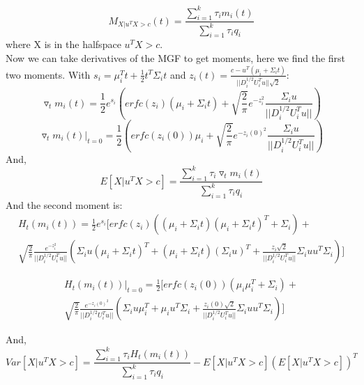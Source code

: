 \documentclass{article}
\begin{document}
\begin{equation}
\label{eq:mgf}
M_{X|u^TX>c}(t) = \frac{\sum\limits_{i=1}^k \tau_i m_i(t)}{\sum\limits_{i=1}^k \tau_i q_i}
\end{equation}
where X is in the halfspace $u^TX > c$. \\
\null \quad Now we can take derivatives of the MGF to get moments, here we find the first two moments. With $s_i=\mu_i^Tt+\frac{1}{2}t^T\Sigma_i t$ and $z_i(t) = \frac{c - u^T(\mu_i + \Sigma_i t)}{||D_i^{1/2}U_i^Tu||\sqrt{2}}$:
\begin{equation}
\triangledown_tm_i(t) = \frac{1}{2}e^{s_i}(erfc(z_i)(\mu_i+\Sigma_i t) + \sqrt{\frac{2}{\pi}}e^{-z_i^2}\frac{\Sigma_i u}{||D_i^{1/2}U_i^Tu||})
\end{equation}
\begin{equation}
\triangledown_tm_i(t) |_{t=0}= \frac{1}{2}(erfc(z_i(0))\mu_i + \sqrt{\frac{2}{\pi}}e^{-z_i(0)^2}\frac{\Sigma_i u}{||D_i^{1/2}U_i^Tu||})
\end{equation}
And,
\begin{equation}
E[X|u^TX>c] =  \frac{\sum\limits_{i=1}^k \tau_i \triangledown_t m_i(t)}{\sum\limits_{i=1}^k \tau_i q_i}
\end{equation}
And the second moment is:
\begin{equation}
\begin{split}
H_t(m_i(t)) = \frac{1}{2}e^{s_i}[erfc(z_i)((\mu_i + \Sigma_it)(\mu_i + \Sigma_it)^T + \Sigma_i) + \\ \sqrt{\frac{2}{\pi}}\frac{e^{-z_i^2}}{||D_i^{1/2}U_i^Tu||} (\Sigma_i u (\mu_i + \Sigma_i t)^T + (\mu_i + \Sigma_i t)(\Sigma_i u)^T +  \frac{z_i  \sqrt{2}}{||D_i^{1/2}U_i^Tu||}\Sigma_i u u^T \Sigma_i)]
\end{split}
\end{equation}

\begin{equation}
\begin{split}
H_t(m_i(t))|_{t=0} = \frac{1}{2}[erfc(z_i(0))(\mu_i\mu_i^T + \Sigma_i) + \\ \sqrt{\frac{2}{\pi}}\frac{e^{-z_i(0)^2}}{||D_i^{1/2}U_i^Tu||} (\Sigma_i u \mu_i^T + \mu_i u^T \Sigma_i + \frac{z_i(0) \sqrt{2}}{||D_i^{1/2}U_i^Tu||}\Sigma_i u u^T \Sigma_i)]
\end{split}
\end{equation}

And,
\begin{equation}
Var[X|u^TX>c] =  \frac{\sum\limits_{i=1}^k \tau_i H_t(m_i(t))}{\sum\limits_{i=1}^k \tau_i q_i} - E[X|u^TX>c] (E[X|u^TX>c])^T
\end{equation}
\end{document}
